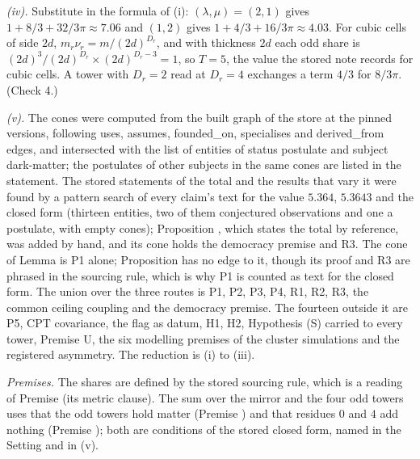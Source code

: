 \emph{(iv).} Substitute in the formula of (i): $(\lambda, \mu) = (2, 1)$ gives $1 + 8/3 + 32/3\pi \approx 7.06$ and $(1, 2)$ gives $1 + 4/3 + 16/3\pi \approx 4.03$. For cubic cells of side $2d$, $m_{r}\nu_{r} = m/(2d)^{D_{r}}$, and with thickness $2d$ each odd share is $(2d)^{3}/(2d)^{D_{r}} \times (2d)^{D_{r}-3} = 1$, so $T = 5$, the value the stored note  records for cubic cells. A tower with $D_{r} = 2$ read at $D_{r} = 4$ exchanges a term $4/3$ for $8/3\pi$. (Check 4.)

\emph{(v).} The cones were computed from the built graph of the store at the pinned versions, following uses, assumes, founded\_on, specialises and derived\_from edges, and intersected with the list of entities of status postulate and subject dark-matter; the postulates of other subjects in the same cones are listed in the statement. The stored statements of the total and the results that vary it were found by a pattern search of every claim's text for the value $5.364$, $5.3643$ and the closed form (thirteen entities, two of them conjectured observations and one a postulate, with empty cones); Proposition , which states the total by reference, was added by hand, and its cone holds the democracy premise and R3. The cone of Lemma  is P1 alone; Proposition  has no edge to it, though its proof and R3 are phrased in the sourcing rule, which is why P1 is counted as text for the closed form. The union over the three routes is P1, P2, P3, P4, R1, R2, R3, the common ceiling coupling and the democracy premise. The fourteen outside it are P5, CPT covariance, the flag as datum, H1, H2, Hypothesis (S) carried to every tower, Premise U, the six modelling premises of the cluster simulations and the registered asymmetry. The reduction is (i) to (iii).

\emph{Premises.} The shares are defined by the stored sourcing rule, which is a reading of Premise  (its metric clause). The sum over the mirror and the four odd towers uses that the odd towers hold matter (Premise ) and that residues $0$ and $4$ add nothing (Premise ); both are conditions of the stored closed form, named in the Setting and in (v).
